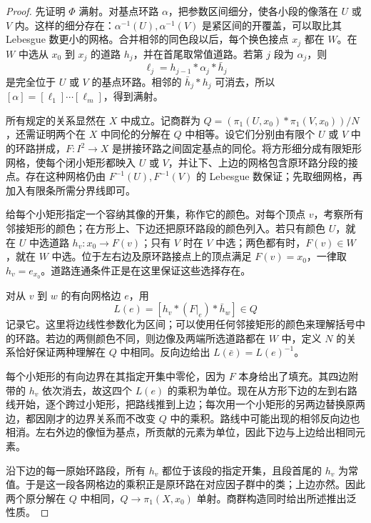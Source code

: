 \begin{proof}
	先证明 \(\Phi\) 满射。对基点环路 \(\alpha\)，把参数区间细分，使各小段的像落在 \(U\) 或 \(V\) 内。这样的细分存在：\(\alpha^{-1}(U),\alpha^{-1}(V)\) 是紧区间的开覆盖，可以取比其 Lebesgue 数更小的网格。合并相邻的同色段以后，每个换色接点 \(x_j\) 都在 \(W\)。在 \(W\) 中选从 \(x_0\) 到 \(x_j\) 的道路 \(h_j\)，并在首尾取常值道路。若第 \(j\) 段为 \(\alpha_j\)，则
	\[
		\ell_j=h_{j-1}*\alpha_j*\bar h_j
	\]
	是完全位于 \(U\) 或 \(V\) 的基点环路。相邻的 \(\bar h_j*h_j\) 可消去，所以 \([\alpha]=[\ell_1]\cdots[\ell_m]\)，得到满射。

	所有规定的关系显然在 \(X\) 中成立。记商群为 \(Q=(\pi_1(U,x_0)*\pi_1(V,x_0))/N\)，还需证明两个在 \(X\) 中同伦的分解在 \(Q\) 中相等。设它们分别由有限个 \(U\) 或 \(V\) 中的环路拼成，\(F:I^2\rightarrow X\) 是拼接环路之间固定基点的同伦。将方形细分成有限矩形网格，使每个闭小矩形都映入 \(U\) 或 \(V\)，并让下、上边的网格包含原环路分段的接点。存在这种网格仍由 \(F^{-1}(U),F^{-1}(V)\) 的 Lebesgue 数保证；先取细网格，再加入有限条所需分界线即可。

	给每个小矩形指定一个容纳其像的开集，称作它的颜色。对每个顶点 \(v\)，考察所有邻接矩形的颜色；在方形上、下边还把原环路段的颜色列入。若只有颜色 \(U\)，就在 \(U\) 中选道路 \(h_v:x_0\rightarrow F(v)\)；只有 \(V\) 时在 \(V\) 中选；两色都有时，\(F(v)\in W\)，就在 \(W\) 中选。位于左右边及原环路接点上的顶点满足 \(F(v)=x_0\)，一律取 \(h_v=e_{x_0}\)。道路连通条件正是在这里保证这些选择存在。

	对从 \(v\) 到 \(w\) 的有向网格边 \(e\)，用
	\[
		L(e)=[h_v*(F|_e)*\bar h_w]\in Q
	\]
	记录它。这里将边线性参数化为区间；可以使用任何邻接矩形的颜色来理解括号中的环路。若边的两侧颜色不同，则边像及两端所选道路都在 \(W\) 中，定义 \(N\) 的关系恰好保证两种理解在 \(Q\) 中相同。反向边给出 \(L(\bar e)=L(e)^{-1}\)。

	每个小矩形的有向边界在其指定开集中零伦，因为 \(F\) 本身给出了填充。其四边附带的 \(h_v\) 依次消去，故这四个 \(L(e)\) 的乘积为单位。现在从方形下边的左到右路线开始，逐个跨过小矩形，把路线推到上边；每次用一个小矩形的另两边替换原两边，都因刚才的边界关系而不改变 \(Q\) 中的乘积。路线中可能出现的相邻反向边也相消。左右外边的像恒为基点，所贡献的元素为单位，因此下边与上边给出相同元素。

	沿下边的每一原始环路段，所有 \(h_v\) 都位于该段的指定开集，且段首尾的 \(h_v\) 为常值。于是这一段各网格边的乘积正是原环路在对应因子群中的类；上边亦然。因此两个原分解在 \(Q\) 中相同，\(Q\rightarrow\pi_1(X,x_0)\) 单射。商群构造同时给出所述推出泛性质。
\end{proof}


